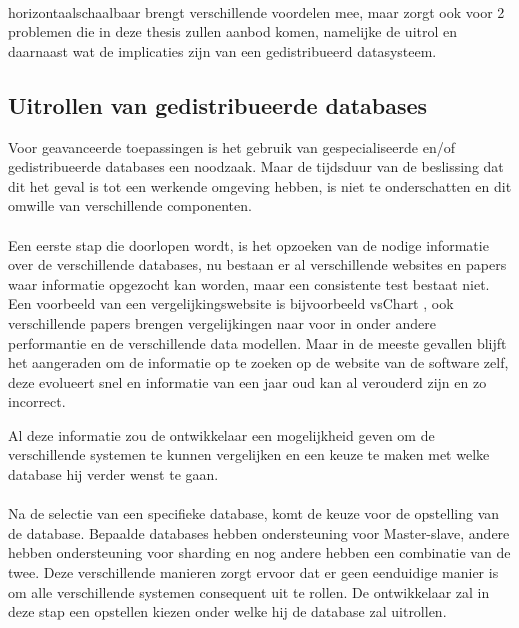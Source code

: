 \documentclass{book}
\begin{document}
\paragraph{}
\Gls{horizontaalschaalbaar} brengt verschillende voordelen mee, maar zorgt ook voor 2 problemen die in deze thesis zullen aanbod komen, namelijke de uitrol en daarnaast wat de implicaties zijn van een gedistribueerd datasysteem. 

\subsection{Uitrollen van gedistribueerde databases}
Voor geavanceerde toepassingen is het gebruik van gespecialiseerde en/of gedistribueerde databases een noodzaak. Maar de tijdsduur van de beslissing dat dit het geval is tot een werkende omgeving hebben, is niet te onderschatten en dit omwille van verschillende componenten. 

\paragraph{}Een eerste stap die doorlopen wordt, is het opzoeken van de nodige informatie over de verschillende databases, nu bestaan er al verschillende websites en papers waar informatie opgezocht kan worden, maar een consistente test bestaat niet. Een voorbeeld van een vergelijkingswebsite is bijvoorbeeld vsChart \cite{vsChart}, ook verschillende papers brengen vergelijkingen naar voor in onder andere performantie en de verschillende data modellen. Maar in de meeste gevallen blijft het aangeraden om de informatie op te zoeken op de website van de software zelf, deze evolueert snel en informatie van een jaar oud kan al verouderd zijn en zo incorrect. 

Al deze informatie zou de ontwikkelaar een mogelijkheid geven om de verschillende systemen te kunnen vergelijken en een keuze te maken met welke database hij verder wenst te gaan. 

\paragraph{} Na de selectie van een specifieke database, komt de keuze voor de opstelling van de database. Bepaalde databases hebben ondersteuning voor Master-slave, andere hebben ondersteuning voor sharding en nog andere hebben een combinatie van de twee. Deze verschillende manieren zorgt ervoor dat er geen eenduidige manier is om alle verschillende systemen consequent uit te rollen. De ontwikkelaar zal in deze stap een opstellen kiezen onder welke hij de database zal uitrollen. 
\end{document}
